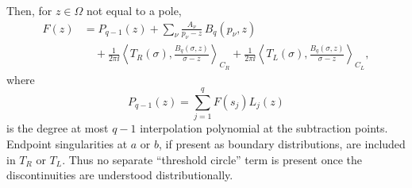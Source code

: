 \begin{theorem}
\begin{equation}
  \label{eq:fixed-t-cauchy-subtraction-kernels}
\end{equation}
Then, for \(z\in\Omega\) not equal to a pole,
\begin{align}
  F(z)
  &=
  P_{q-1}(z)
  +
  \sum_\nu
  \frac{A_\nu}{p_\nu-z}\,B_q(p_\nu,z)
  \nonumber\\
  &\quad
  +
  \frac{1}{2\pi\ii}
  \left\langle T_R(\sigma),
    \frac{B_q(\sigma,z)}{\sigma-z}
  \right\rangle_{C_R}
  +
  \frac{1}{2\pi\ii}
  \left\langle T_L(\sigma),
    \frac{B_q(\sigma,z)}{\sigma-z}
  \right\rangle_{C_L},
  \label{eq:fixed-t-finite-subtraction-cauchy-theorem}
\end{align}
where
\begin{equation}
  P_{q-1}(z)=\sum_{j=1}^qF(s_j)L_j(z)
  \label{eq:fixed-t-cauchy-interpolation-polynomial}
\end{equation}
is the degree at most \(q-1\) interpolation polynomial at the subtraction
points.  Endpoint singularities at \(a\) or \(b\), if present as boundary
distributions, are included in \(T_R\) or \(T_L\).  Thus no separate
``threshold circle'' term is present once the discontinuities are understood
distributionally.
\end{theorem}

